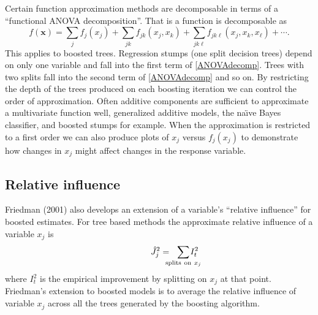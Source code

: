 \documentclass{article}
\begin{document}
Certain function approximation methods are decomposable in terms of a ``functional ANOVA decomposition''.
That is a function is decomposable as
\begin{equation}
\label{ANOVAdecomp} f(\mathbf{x}) = \sum_j f_j(x_j) + \sum_{jk}
f_{jk}(x_j,x_k) + \sum_{jk\ell} f_{jk\ell}(x_j,x_k,x_\ell) + \cdots.
\end{equation}
This applies to boosted trees. Regression stumps (one split decision trees) depend on only one variable and
fall into the first term of \ref{ANOVAdecomp}. Trees with two splits fall into the second term of \ref{ANOVAdecomp} and so on. By restricting the depth of the trees produced on each boosting iteration we can control the order of approximation. Often additive components are sufficient to approximate a multivariate function well, generalized additive models, the na\"{\i}ve Bayes classifier, and boosted stumps for example. When the approximation is restricted to a first order we can also produce plots of $x_j$ versus $f_j(x_j)$ to demonstrate how changes in $x_j$ might affect changes in the response variable.

\subsection{Relative influence}
Friedman (2001) also develops an extension of a variable's ``relative
influence'' for boosted estimates. For tree based methods the approximate
relative influence of a variable $x_j$ is
\begin{equation}
\label{RelInfluence} \hspace{0.5in} \hat J_j^2 =
\hspace{-0.1in}\sum_{\mathrm{splits~on~}x_j}\hspace{-0.2in}I_t^2
\end{equation}
where $I_t^2$ is the empirical improvement by splitting on $x_j$ at that
point. Friedman's extension to boosted models is to average the relative
influence of variable $x_j$ across all the trees generated by the boosting
algorithm.
\end{document}
